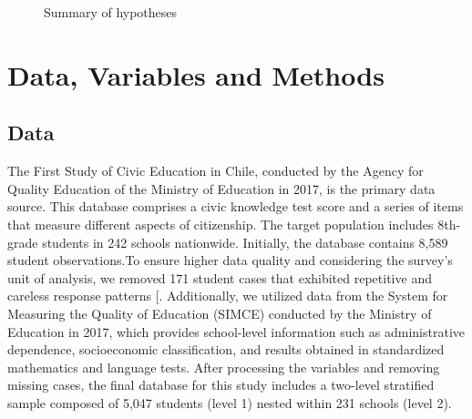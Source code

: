 \documentclass[
  12pt,
  letterpaper,
]{article}
\begin{document}
\begin{figure}


\caption{\label{fig-hypotheses}Summary of hypotheses}

\end{figure}%

\section{Data, Variables and Methods}\label{data-variables-and-methods}

\subsection{Data}\label{data}

The First Study of Civic Education in Chile, conducted by the Agency for
Quality Education of the Ministry of Education in 2017, is the primary
data source. This database comprises a civic knowledge test score and a
series of items that measure different aspects of citizenship. The
target population includes 8th-grade students in 242 schools nationwide.
Initially, the database contains 8,589 student observations.To ensure
higher data quality and considering the survey's unit of analysis, we
removed 171 student cases that exhibited repetitive and careless
response patterns
{[}\citeproc{ref-gottfried_autocorrelation_2022}{73}{]}. Additionally,
we utilized data from the System for Measuring the Quality of Education
(SIMCE) conducted by the Ministry of Education in 2017, which provides
school-level information such as administrative dependence,
socioeconomic classification, and results obtained in standardized
mathematics and language tests. After processing the variables and
removing missing cases, the final database for this study includes a
two-level stratified sample composed of 5,047 students (level 1) nested
within 231 schools (level 2).
\end{document}
